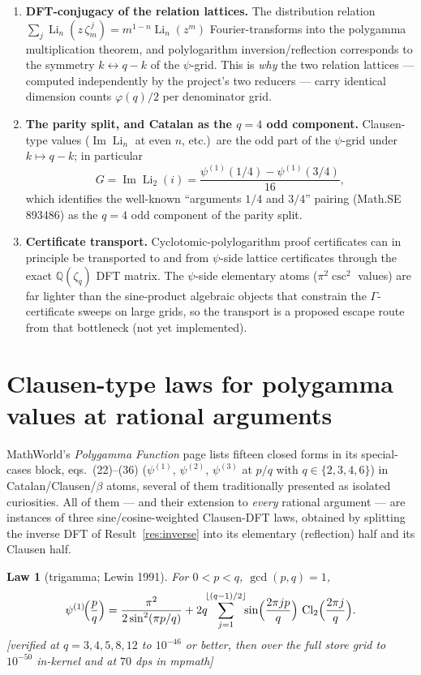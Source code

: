 \documentclass[11pt]{article}
\newtheorem{law}[result]{Law}
\theoremstyle{remark}
\newcommand{\Li}{\operatorname{Li}}
\newcommand{\Cl}{\operatorname{Cl}}
\newcommand{\Catalan}{G}
\newcommand{\dps}[1]{\textsf{\footnotesize[#1]}}
\begin{document}
\begin{enumerate}
\item \textbf{DFT-conjugacy of the relation lattices.} The distribution relation
$\sum_{j}\Li_n(z\,\zeta_m^{\,j})=m^{1-n}\Li_n(z^m)$ Fourier-transforms into the polygamma
multiplication theorem, and polylogarithm inversion/reflection corresponds to the symmetry
$k\leftrightarrow q-k$ of the $\psi$-grid. This is \emph{why} the two relation lattices ---
computed independently by the project's two reducers --- carry identical dimension counts
$\varphi(q)/2$ per denominator grid.
\item \textbf{The parity split, and Catalan as the $q=4$ odd component.} Clausen-type
values ($\operatorname{Im}\Li_n$ at even $n$, etc.)\ are the odd part of the $\psi$-grid
under $k\mapsto q-k$; in particular
\[
\Catalan=\operatorname{Im}\Li_2(i)=\frac{\psi^{(1)}(1/4)-\psi^{(1)}(3/4)}{16},
\]
which identifies the well-known ``arguments $1/4$ and $3/4$'' pairing (Math.SE 893486) as
the $q=4$ odd component of the parity split.
\item \textbf{Certificate transport.} Cyclotomic-polylogarithm proof certificates can in
principle be transported to and from $\psi$-side lattice certificates through the exact
$\mathbb{Q}(\zeta_q)$ DFT matrix. The $\psi$-side elementary atoms ($\pi^2\csc^2$ values)
are far lighter than the sine-product algebraic objects that constrain the
$\Gamma$-certificate sweeps on large grids, so the transport is a proposed escape route
from that bottleneck (not yet implemented).
\end{enumerate}

\section{Clausen-type laws for polygamma values at rational arguments}\label{sec:laws}

MathWorld's \emph{Polygamma Function} page lists fifteen closed forms in its
special-cases block, eqs.~(22)--(36) ($\psi^{(1)}$, $\psi^{(2)}$, $\psi^{(3)}$ at $p/q$
with $q\in\{2,3,4,6\}$) in Catalan/Clausen/$\beta$ atoms, several of them traditionally
presented as isolated curiosities. All of them ---
and their extension to \emph{every} rational argument --- are instances of three
sine/cosine-weighted Clausen-DFT laws, obtained by splitting the inverse DFT of
Result~\ref{res:inverse} into its elementary (reflection) half and its Clausen half.

\begin{law}[trigamma; Lewin 1991]\label{law:psi1}
For $0<p<q$, $\gcd(p,q)=1$,
\[
\psi^{(1)}\!\Bigl(\frac{p}{q}\Bigr)
=\frac{\pi^2}{2\sin^2(\pi p/q)}
+2q\!\!\sum_{j=1}^{\lfloor(q-1)/2\rfloor}\!\!\sin\Bigl(\frac{2\pi jp}{q}\Bigr)\,
\Cl_2\Bigl(\frac{2\pi j}{q}\Bigr).
\]
\dps{verified at $q=3,4,5,8,12$ to $10^{-46}$ or better, then over the full store grid to
$10^{-50}$ in-kernel and at $70$ dps in mpmath}
\end{law}
\end{document}

